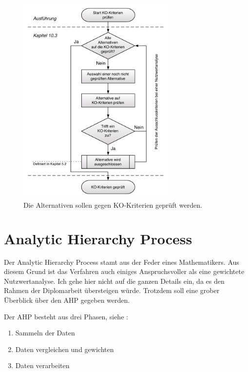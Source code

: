   \begin{figure}[htb]
    \begin{center}
      \includegraphics[width=0.7\textwidth]{./image/rahmenbedingungenPruefen.pdf}
      \caption{Die Alternativen sollen gegen KO-Kriterien geprüft werden.}
      \label{img:rahmenbedingungenPruefen}
    \end{center}
  \end{figure}
  
  \clearpage
 
  \section{Analytic Hierarchy Process}
  
  Der Analytic Hierarchy Process stamt aus der Feder eines Mathematikers. Aus
  diesem Grund ist das Verfahren auch einiges Anspruchsvoller als eine
  gewichtete Nutzwertanalyse. Ich gehe hier nicht auf die ganzen Details ein, da
  es den Rahmen der Diplomarbeit übersteigen würde. Trotzdem soll eine grober
  Überblick über den \ac{AHP} gegeben werden.
  
  Der \ac{AHP} besteht aus drei Phasen, siehe \cite{AnalyticHierarchyProcess}: 
  
  \begin{enumerate}
    \item Sammeln der Daten
    \item Daten vergleichen und gewichten
    \item Daten verarbeiten
  \end{enumerate}
  
